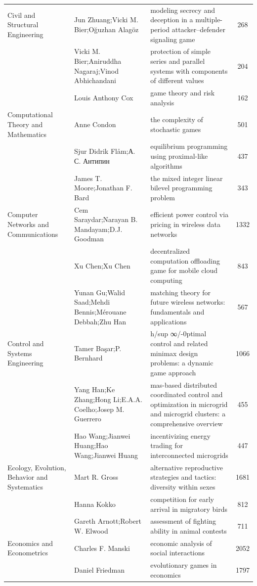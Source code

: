 \documentclass[
  12pt,
]{article}
\begin{document}
\begin{longtable}[t]{|>{\raggedright\arraybackslash}p{4cm}>{\raggedright\arraybackslash}p{4cm}>{\raggedright\arraybackslash}p{4cm}>{}c|}
Civil and Structural Engineering & Jun Zhuang;Vicki M. Bier;Oğuzhan Alagöz & modeling secrecy and deception in a multiple-period attacker–defender signaling game & 268\\
 & Vicki M. Bier;Aniruddha Nagaraj;Vinod Abhichandani & protection of simple series and parallel systems with components of different values & 204\\
 & Louis Anthony Cox & game theory and risk analysis & 162\\
Computational Theory and Mathematics & Anne Condon & the complexity of stochastic games & 501\\
 & Sjur Didrik Flåm;А. С. Антипин & equilibrium programming using proximal-like algorithms & 437\\
 & James T. Moore;Jonathan F. Bard & the mixed integer linear bilevel programming problem & 343\\
Computer Networks and Communications & Cem Saraydar;Narayan B. Mandayam;D.J. Goodman & efficient power control via pricing in wireless data networks & 1332\\
 & Xu Chen;Xu Chen & decentralized computation offloading game for mobile cloud computing & 843\\
 & Yunan Gu;Walid Saad;Mehdi Bennis;Mérouane Debbah;Zhu Han & matching theory for future wireless networks: fundamentals and applications & 567\\
Control and Systems Engineering & Tamer Başar;P. Bernhard & h/sup ∞/-0ptimal control and related minimax design problems: a dynamic game approach & 1066\\
 & Yang Han;Ke Zhang;Hong Li;E.A.A. Coelho;Josep M. Guerrero & mas-based distributed coordinated control and optimization in microgrid and microgrid clusters: a comprehensive overview & 455\\
 & Hao Wang;Jianwei Huang;Hao Wang;Jianwei Huang & incentivizing energy trading for interconnected microgrids & 447\\
Ecology, Evolution, Behavior and Systematics & Mart R. Gross & alternative reproductive strategies and tactics: diversity within sexes & 1681\\
 & Hanna Kokko & competition for early arrival in migratory birds & 812\\
 & Gareth Arnott;Robert W. Elwood & assessment of fighting ability in animal contests & 711\\
Economics and Econometrics & Charles F. Manski & economic analysis of social interactions & 2052\\
 & Daniel Friedman & evolutionary games in economics & 1797\\

\end{longtable}
\end{document}
